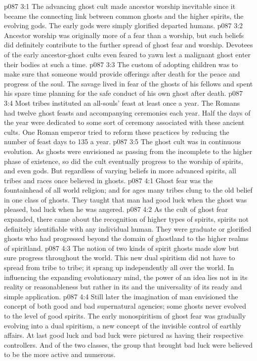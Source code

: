 \vs p087 3:1 The advancing ghost cult made ancestor worship inevitable since it became the connecting link between common ghosts and the higher spirits, the evolving gods. The early gods were simply glorified departed humans.
\vs p087 3:2 Ancestor worship was originally more of a fear than a worship, but such beliefs did definitely contribute to the further spread of ghost fear and worship. Devotees of the early ancestor\hyp{}ghost cults even feared to yawn lest a malignant ghost enter their bodies at such a time.
\vs p087 3:3 The custom of adopting children was to make sure that someone would provide offerings after death for the peace and progress of the soul. The savage lived in fear of the ghosts of his fellows and spent his spare time planning for the safe conduct of his own ghost after death.
\vs p087 3:4 Most tribes instituted an all\hyp{}souls’ feast at least once a year. The Romans had twelve ghost feasts and accompanying ceremonies each year. Half the days of the year were dedicated to some sort of ceremony associated with these ancient cults. One Roman emperor tried to reform these practices by reducing the number of feast days to 135 a year.
\pc \vs p087 3:5 The ghost cult was in continuous evolution. As ghosts were envisioned as passing from the incomplete to the higher phase of existence, so did the cult eventually progress to the worship of spirits, and even gods. But regardless of varying beliefs in more advanced spirits, all tribes and races once believed in ghosts.
\vs p087 4:1 Ghost fear was the fountainhead of all world religion; and for ages many tribes clung to the old belief in one class of ghosts. They taught that man had good luck when the ghost was pleased, bad luck when he was angered.
\vs p087 4:2 As the cult of ghost fear expanded, there came about the recognition of higher types of spirits, spirits not definitely identifiable with any individual human. They were graduate or glorified ghosts who had progressed beyond the domain of ghostland to the higher realms of spiritland.
\vs p087 4:3 The notion of two kinds of spirit ghosts made slow but sure progress throughout the world. This new dual spiritism did not have to spread from tribe to tribe; it sprang up independently all over the world. In influencing the expanding evolutionary mind, the power of an idea lies not in its reality or reasonableness but rather in its  and the universality of its ready and simple application.
\vs p087 4:4 Still later the imagination of man envisioned the concept of both good and bad supernatural agencies; some ghosts never evolved to the level of good spirits. The early monospiritism of ghost fear was gradually evolving into a dual spiritism, a new concept of the invisible control of earthly affairs. At last good luck and bad luck were pictured as having their respective controllers. And of the two classes, the group that brought bad luck were believed to be the more active and numerous.
